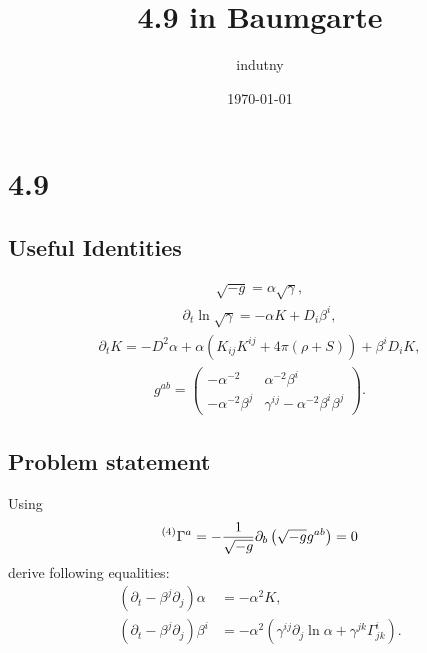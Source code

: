 \documentclass[aps,prd,preprint]{revtex4-1}
\begin{document}
\title{4.9 in Baumgarte}
\author{indutny}
\date{\today}
\noaffiliation

\maketitle

\section{4.9}

\subsection{Useful Identities}

\begin{align} \label{eq:det-rel}
  \sqrt{-g} = \alpha \sqrt{\gamma},
\end{align}
\begin{align} \label{eq:det-derivative}
  \partial_t \ln \sqrt{\gamma} = -\alpha K + D_i \beta^i,
\end{align}
\begin{align} \label{eq:k-derivative}
  \partial_t K = -D^2 \alpha +
    \alpha \left( K_{ij} K^{ij} + 4 \pi (\rho + S) \right) +
    \beta^i D_i K,
\end{align}
\begin{align} \label{eq:g-upper}
  g^{ab} = \begin{pmatrix}
    -\alpha^{-2} & \alpha^{-2} \beta^i \\
    -\alpha^{-2} \beta^j & \gamma^{ij} - \alpha^{-2} \beta^i \beta^j
  \end{pmatrix}.
\end{align}

\subsection{Problem statement}

Using
\begin{align} \label{eq:christoffel-contraction}
  \prescript{(4)}{} \Gamma^a = -\frac{1}{\sqrt{-g}} \partial_b \left(
    \sqrt{-g} g^{ab}
  \right) = 0
\end{align}
derive following equalities:
\begin{align}
  (\partial_t - \beta^j \partial_j) \alpha & = -\alpha^2 K,
    \label{eq:first-result}\\
  (\partial_t - \beta^j \partial_j) \beta^i & =
    - \alpha^2 \left( \gamma^{ij} \partial_j \ln \alpha +
    \gamma^{jk} \Gamma^i_{jk} \right) \label{eq:second-result}.
\end{align}
\end{document}
